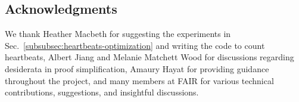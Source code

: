 \subsection{Acknowledgments}
We thank Heather Macbeth for suggesting the experiments in Sec.~\ref{subsubsec:heartbeats-optimization} and writing the code to count heartbeats, Albert Jiang and Melanie Matchett Wood for discussions regarding desiderata in proof simplification, Amaury Hayat for providing guidance throughout the project, and many members at FAIR for various technical contributions, suggestions, and insightful discussions.